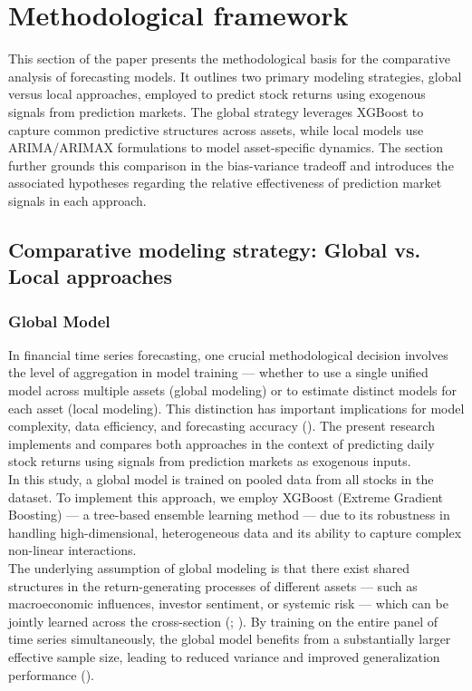 \documentclass[12pt]{report}
\begin{document}
\newpage
\section{Methodological framework}
This section of the paper presents the methodological basis for the comparative analysis of forecasting models. It outlines two primary modeling strategies, global versus local approaches, employed to predict stock returns using exogenous signals from prediction markets. The global strategy leverages XGBoost to capture common predictive structures across assets, while local models use ARIMA/ARIMAX formulations to model asset-specific dynamics. The section further grounds this comparison in the bias-variance tradeoff and introduces the associated hypotheses regarding the relative effectiveness of prediction market signals in each approach.

\subsection{Comparative modeling strategy: Global vs. Local approaches}

\subsubsection{Global Model}
\label{sec:xgboost_theory}
In financial time series forecasting, one crucial methodological decision involves the level of aggregation in model training — whether to use a single unified model across multiple assets (global modeling) or to estimate distinct models for each asset (local modeling). This distinction has important implications for model complexity, data efficiency, and forecasting accuracy (\cite{hewamalage_recurrent_2021}). The present research implements and compares both approaches in the context of predicting daily stock returns using signals from prediction markets as exogenous inputs.\\

In this study, a global model is trained on pooled data from all stocks in the dataset. To implement this approach, we employ XGBoost (Extreme Gradient Boosting) — a tree-based ensemble learning method — due to its robustness in handling high-dimensional, heterogeneous data and its ability to capture complex non-linear interactions.\\

The underlying assumption of global modeling is that there exist shared structures in the return-generating processes of different assets — such as macroeconomic influences, investor sentiment, or systemic risk — which can be jointly learned across the cross-section (\cite{hartford_deep_2018}; \cite{gu_empirical_2020}). By training on the entire panel of time series simultaneously, the global model benefits from a substantially larger effective sample size, leading to reduced variance and improved generalization performance (\cite{montero_modelling_2021}).\\
\end{document}
